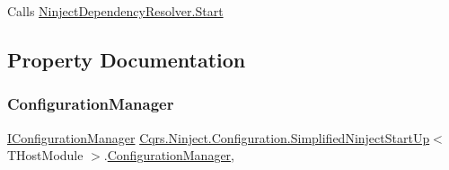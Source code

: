 Calls \hyperlink{classCqrs_1_1Ninject_1_1Configuration_1_1NinjectDependencyResolver_adc6171ed45679dcbaa67782770ba5083_adc6171ed45679dcbaa67782770ba5083}{Ninject\+Dependency\+Resolver.\+Start} 



\subsection{Property Documentation}
\mbox{\label{classCqrs_1_1Ninject_1_1Configuration_1_1SimplifiedNinjectStartUp_ae47357929d5c42f602a97e6b5dd6b0c4_ae47357929d5c42f602a97e6b5dd6b0c4}} 
\subsubsection{\texorpdfstring{Configuration\+Manager}{ConfigurationManager}}
{\footnotesize\ttfamily \hyperlink{interfaceCqrs_1_1Configuration_1_1IConfigurationManager}{I\+Configuration\+Manager} \hyperlink{classCqrs_1_1Ninject_1_1Configuration_1_1SimplifiedNinjectStartUp}{Cqrs.\+Ninject.\+Configuration.\+Simplified\+Ninject\+Start\+Up}$<$ T\+Host\+Module $>$.\hyperlink{classCqrs_1_1Configuration_1_1ConfigurationManager}{Configuration\+Manager}\hspace{0.3cm}{\ttfamily [get]}, {\ttfamily [protected]}}

